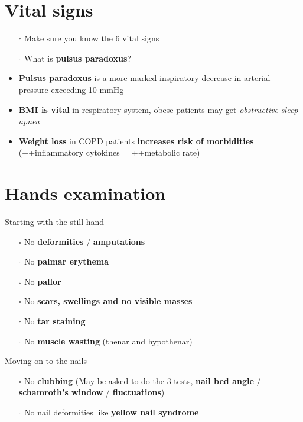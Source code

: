 \documentclass[
  13.5pt,
  a4paper,
  DIV=11,
  numbers=noendperiod]{scrreprt}
\providecommand{\tightlist}{%
  \setlength{\itemsep}{0pt}\setlength{\parskip}{0pt}}
\begin{document}
\section{Vital signs}\label{vital-signs-1}

\begin{itemize}
\item[$\square$]
  Make sure you know the 6 vital signs
\item[$\square$]
  What is \textbf{pulsus paradoxus}?
\item
  \textbf{Pulsus paradoxus} is a more marked inspiratory decrease in
  arterial pressure exceeding 10 mmHg
\item
  \textbf{BMI is vital} in respiratory system, obese patients may get
  \emph{obstructive sleep apnea}
\item
  \textbf{Weight loss} in COPD patients \textbf{increases risk of
  morbidities} (++inflammatory cytokines = ++metabolic rate)
\end{itemize}

\section{Hands examination}\label{hands-examination}

Starting with the still hand

\begin{itemize}
\tightlist
\item[$\square$]
  No \textbf{deformities} / \textbf{amputations}
\item[$\square$]
  No \textbf{palmar erythema}
\item[$\square$]
  No \textbf{pallor}
\item[$\square$]
  No \textbf{scars, swellings and no visible masses}
\item[$\square$]
  No \textbf{tar staining}
\item[$\square$]
  No \textbf{muscle wasting} (thenar and hypothenar)
\end{itemize}

Moving on to the nails

\begin{itemize}
\tightlist
\item[$\square$]
  No \textbf{clubbing} (May be asked to do the 3 tests, \textbf{nail bed
  angle} / \textbf{schamroth's window} / \textbf{fluctuations})
\item[$\square$]
  No nail deformities like \textbf{yellow nail syndrome}
\end{itemize}
\end{document}
